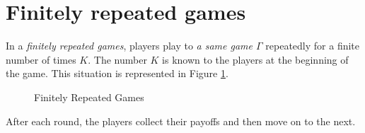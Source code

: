 \section{Finitely repeated games}
\label{sec:FinRep}
In a \emph{finitely repeated games}, players play to \emph{a same game $\Gamma$} repeatedly for a finite number of times $K$. The number $K$ is known to the players at the beginning of the game. This situation is represented in Figure \ref{fig:repeatedFiniteNumberOfTimes}.
\begin{figure}[!ht]
\centering
{}
\caption{Finitely Repeated Games}
\label{fig:repeatedFiniteNumberOfTimes}
\end{figure}
After each round, the players collect their payoffs and then move on to the next.

